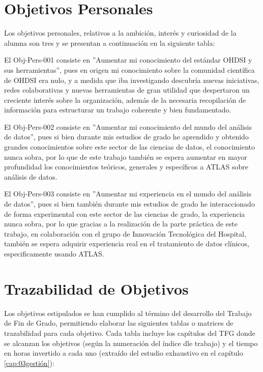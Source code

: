 \section{Objetivos Personales}

Los objetivos personales, relativos a la ambición, interés y curiosidad de la alumna son tres y se presentan a continuación en la siguiente tabla:



El Obj-Pers-001 consiste en ''Aumentar mi conocimiento del estándar OHDSI y sus herramientas'', pues en origen mi conocimiento sobre la comunidad científica de OHDSI era nulo, y a medida que iba investigando descubría nuevas iniciativas, redes colaborativas y nuevas herramientas de gran utilidad que despertaron un creciente interés sobre la organización, además de la necesaria recopilación de información para estructurar un trabajo coherente y bien fundamentado.

El Obj-Pers-002 consiste en ''Aumentar mi conocimiento del mundo del análisis de datos'', pues si bien durante mis estudios de grado he aprendido y obtenido grandes conocimientos sobre este sector de las ciencias de datos, el conocimiento nunca sobra, por lo que de este trabajo también se espera aumentar en mayor profundidad los conocimientos teóricos, generales y específicos a ATLAS sobre análisis de datos.

El Obj-Pers-003 consiste en ''Aumentar mi experiencia en el mundo del análisis de datos'', pues si bien también durante mis estudios de grado he interaccionado de forma experimental con este sector de las ciencias de grado, la experiencia nunca sobra, por lo que gracias a la realización de la parte práctica de este trabajo, en colaboración con el grupo de Innovación Tecnológica del Hospital, también se espera adquirir experiencia real en el tratamiento de datos clínicos, especificamente usando ATLAS.

\section{Trazabilidad de Objetivos}

Los objetivos estipulados se han cumplido al término del desarrollo del Trabajo de Fin de Grado, permitiendo elaborar las siguientes tablas o matrices de trazabilidad para cada objetivo. Cada tabla incluye los capítulos del TFG donde se alcanzan los objetivos (según la numeración del índice dle trabajo) y el tiempo en horas invertido a cada uno (extraído del estudio exhaustivo en el capítulo \ref{cap:03gestión}):

